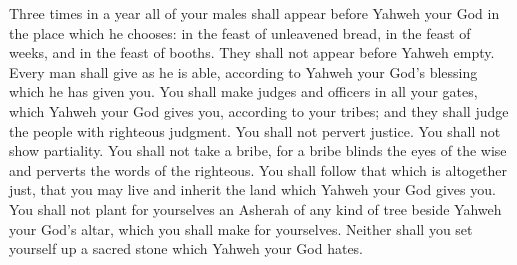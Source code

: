 {Three times in a year all of your males shall appear before Yahweh your God in the place which he chooses: in the feast of unleavened bread, in the feast of weeks, and in the feast of booths. They shall not appear before Yahweh empty.
Every man shall give as he is able, according to Yahweh your God’s blessing which he has given you.
You shall make judges and officers in all your gates, which Yahweh your God gives you, according to your tribes; and they shall judge the people with righteous judgment.
You shall not pervert justice. You shall not show partiality. You shall not take a bribe, for a bribe blinds the eyes of the wise and perverts the words of the righteous.
You shall follow that which is altogether just, that you may live and inherit the land which Yahweh your God gives you.
You shall not plant for yourselves an Asherah of any kind of tree beside Yahweh your God’s altar, which you shall make for yourselves.
Neither shall you set yourself up a sacred stone which Yahweh your God hates.

}
